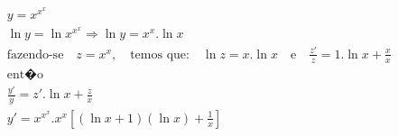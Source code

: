 \begin{ex}
\begin{align}
&y=x^{x^{x}}\nonumber\\
&\ln{y}=\ln{x^{x^{x}}} \Rightarrow \ln{y}=x^{x}.\ln{x}\nonumber\\
&\text{fazendo-se}\quad z=x^x,\quad \text{temos que:}\quad \ln{z}=x.\ln{x}\quad\text{e}\quad \frac{z'}{z}=1.\ln{x}+\frac{x}{x}\nonumber\\
&\text{ent�o}\nonumber\\
&\frac{y'}{y}=z'.\ln{x}+\frac{z}{x}\nonumber\\
&y'=x^{x^{x}}.x^x\left[(\ln{x}+1)(\ln{x})+\frac{1}{x}\right]\nonumber
\end{align}
\end{ex}